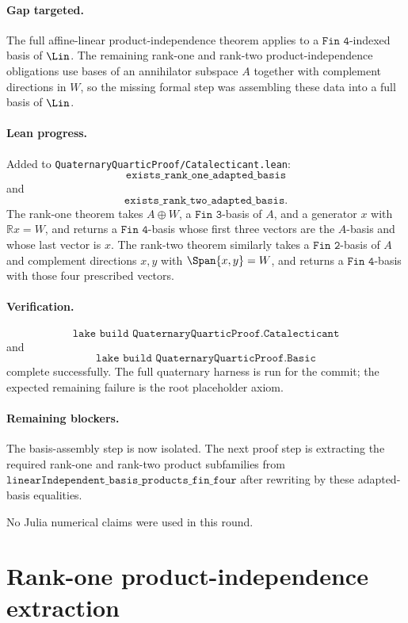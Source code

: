 \documentclass[11pt]{article}
\begin{document}
\paragraph{Gap targeted.}
The full affine-linear product-independence theorem applies to a
\(\texttt{Fin 4}\)-indexed basis of \(\Lin\).  The remaining rank-one and
rank-two product-independence obligations use bases of an annihilator
subspace \(A\) together with complement directions in \(W\), so the missing
formal step was assembling these data into a full basis of \(\Lin\).

\paragraph{Lean progress.}
Added to \texttt{QuaternaryQuarticProof/Catalecticant.lean}:
\[
\texttt{exists\_rank\_one\_adapted\_basis}
\]
and
\[
\texttt{exists\_rank\_two\_adapted\_basis}.
\]
The rank-one theorem takes \(A\oplus W\), a \(\texttt{Fin 3}\)-basis of
\(A\), and a generator \(x\) with \(\mathbb R x=W\), and returns a
\(\texttt{Fin 4}\)-basis whose first three vectors are the \(A\)-basis and
whose last vector is \(x\).  The rank-two theorem similarly takes a
\(\texttt{Fin 2}\)-basis of \(A\) and complement directions \(x,y\) with
\(\Span\{x,y\}=W\), and returns a \(\texttt{Fin 4}\)-basis with those four
prescribed vectors.

\paragraph{Verification.}
\[
\texttt{lake build QuaternaryQuarticProof.Catalecticant}
\]
and
\[
\texttt{lake build QuaternaryQuarticProof.Basic}
\]
complete successfully.  The full quaternary harness is run for the commit; the
expected remaining failure is the root placeholder axiom.

\paragraph{Remaining blockers.}
The basis-assembly step is now isolated.  The next proof step is extracting
the required rank-one and rank-two product subfamilies from
\(\texttt{linearIndependent\_basis\_products\_fin\_four}\) after rewriting by
these adapted-basis equalities.

No Julia numerical claims were used in this round.

\section*{Rank-one product-independence extraction}
\end{document}

